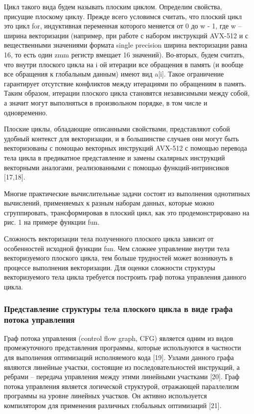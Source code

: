 Цикл такого вида будем называть плоским циклом.
Определим свойства, присущие плоскому циклу.
Прежде всего условимся считать, что плоский цикл это цикл for, индуктивная переменная которого меняется от 0 до w - 1, где w -- ширина векторизации (например, при работе с набором инструкций AVX-512 и с вещественными значениями формата single precision ширина векторизации равна 16, то есть один zmm регистр вмещает 16 значений).
Во-вторых, будем считать, что внутри плоского цикла на i ой итерации все обращения в память (и вообще все обращения к глобальным данным) имеют вид a[i].
Такое ограничение гарантирует отсутствие конфликтов между итерациями по обращениям в память. Таким образом, итерации плоского цикла становятся независимыми между собой, а значит могут выполняться в произвольном порядке, в том числе и одновременно.

Плоские циклы, обладающие описанными свойствами, представляют собой удобный контекст для векторизации, и в большинстве случаев они могут быть векторизованы с помощью векторных инструкций AVX-512 с помощью перевода тела цикла в предикатное представление и замены скалярных инструкций векторными аналогами, реализованными с помощью функций-интринсиков [17,18].

Многие практические вычислительные задачи состоят из выполнения однотипных вычислений, применяемых к разным наборам данных, которые можно сгруппировать, трансформировав в плоский цикл, как это продемонстрировано на рис. 1 на примере функции fun.

Сложность векторизации тела полученного плоского цикла зависит от особенностей исходной функции fun.
Чем сложнее управление 
внутри тела векторизуемого плоского цикла, тем больше трудностей может возникнуть в процессе выполнения векторизации.
Для оценки сложности структуры векторизуемого тела цикла требуется построить граф потока управления данного цикла.

\subsubsection{Представление структуры тела плоского цикла в виде графа потока управления}

Граф потока управления (control flow graph, CFG) является одним из видов промежуточного представления программы, которые используются в частности для выполнения оптимизаций исполняемого кода [19].
Узлами данного графа являются линейные участки, состоящие из последовательностей инструкций, а ребрами -- передача управления между этими линейными участками [20].
Граф потока управления является логической структурой, отражающей параллелизм программы на уровне линейных участков.
Он активно используется компилятором для применения различных глобальных оптимизаций [21].

